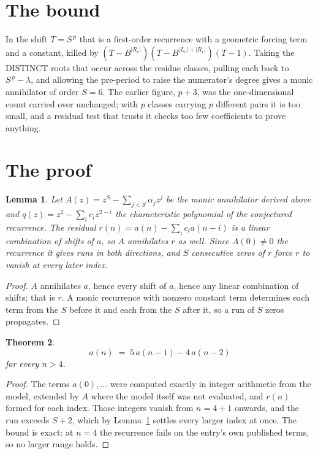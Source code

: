 \documentclass[11pt,a4paper]{article}
\theoremstyle{plain}
\newtheorem{theorem}{Theorem}
\newtheorem{lemma}[theorem]{Lemma}
\theoremstyle{definition}
\begin{document}
\section{The bound}

In the shift $T=S^{\,p}$ that is a first-order recurrence with a geometric forcing term and a
constant, killed by $(T-B^{|R_r|})(T-B^{|L_r|+|R_r|})(T-1)$. Taking the DISTINCT roots that
occur across the residue classes, pulling each back to $S^{\,p}-\lambda$, and allowing the
pre-period to raise the numerator's degree gives a monic annihilator of order $S=6$. The
earlier figure, $p+3$, was the one-dimensional count carried over unchanged; with $p$ classes
carrying $p$ different pairs it is too small, and a residual test that trusts it checks too few
coefficients to prove anything.

\section{The proof}

\begin{lemma}\label{lem:crit}
Let $A(z)=z^S-\sum_{j<S}\alpha_jz^{j}$ be the monic annihilator derived above and
$q(z)=z^{2}-\sum_ic_iz^{2-i}$ the characteristic polynomial of the conjectured
recurrence. The residual $r(n)=a(n)-\sum_ic_ia(n-i)$ is a linear combination of shifts of $a$,
so $A$ annihilates $r$ as well. Since $A(0)\ne0$ the recurrence it gives runs in both
directions, and $S$ consecutive zeros of $r$ force $r$ to vanish at every later index.
\end{lemma}

\begin{proof}
$A$ annihilates $a$, hence every shift of $a$, hence any linear combination of shifts; that is
$r$. A monic recurrence with nonzero constant term determines each term from the $S$ before it
and each from the $S$ after it, so a run of $S$ zeros propagates.
\end{proof}

\begin{theorem}
\[
a(n)\;=\;5\,a(n-1) - 4\,a(n-2)
\]
for every $n>4$.
\end{theorem}

\begin{proof}
The terms $a(0),\dots$ were computed exactly in integer arithmetic from the model, extended by
$A$ where the model itself was not evaluated, and $r(n)$ formed for each index. Those integers
vanish from $n=4+1$ onwards, and the run exceeds $S+2$, which by
Lemma~\ref{lem:crit} settles every larger index at once. The bound is exact: at $n=4$ the recurrence fails on the entry's own published terms, so no larger range holds.
\end{proof}
\end{document}
